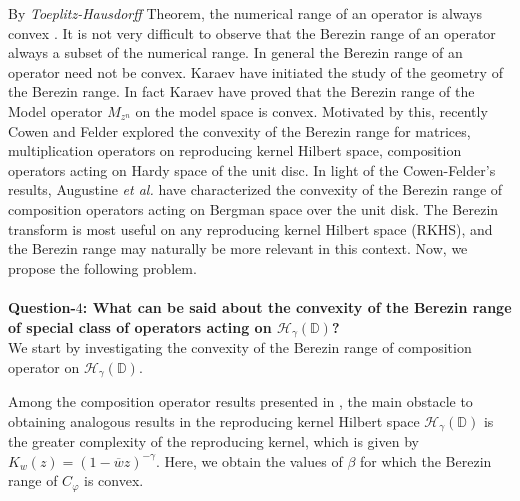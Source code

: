 \documentclass[12pt, reqno]{amsart}
\theoremstyle{definition}
\theoremstyle{remark}
\numberwithin{equation}{section}
\begin{document}
By \textit{Toeplitz-Hausdorff} Theorem, the numerical range of an operator is always convex \cite{Gustafson_PAMS_1970}. It is not very difficult to observe that the Berezin range of an operator always a subset of the numerical range. In general the Berezin range of an operator need not be convex. Karaev \cite{Karaev} have initiated the study of the geometry of the Berezin range. In fact Karaev \cite{Karaev} have proved that the Berezin range of the Model operator $M_{z^n}$ on the model space is convex.  Motivated by this, recently Cowen and Felder \cite{CowenFelder} explored the convexity of the Berezin range for matrices, multiplication operators on reproducing kernel Hilbert space, composition operators acting on Hardy space of the unit disc. In light of the Cowen-Felder's results, Augustine {\it et al.} \cite{Augustine_Garayev_Shankar_CAOT_2023} have characterized the convexity of the Berezin range of composition operators acting on Bergman space over the unit disk.  
The Berezin transform is most useful on any reproducing kernel Hilbert space (RKHS), and the Berezin range may naturally be more relevant in this context. Now, we propose the following problem.
\\ \\
{\bf Question-$4$:  What can be said about the convexity of the Berezin range of special class of operators acting on $\mathcal{H}_\gamma(\mathbb{D})$?}
\\
We start by investigating the convexity of the Berezin range of composition operator on $\mathcal{H}_\gamma(\mathbb{D})$.


Among the composition operator results presented in \cite{Augustine_Garayev_Shankar_CAOT_2023, CowenFelder}, the main obstacle to obtaining analogous results in the reproducing kernel Hilbert space $\mathcal{H}_\gamma(\mathbb{D})$ is the greater complexity of the reproducing kernel, which is given by $ K_w(z)=(1-\overline{w}z)^{-\gamma}.$
Here, we obtain the values of $\beta$ for which the Berezin range of $C_\varphi$ is convex.
\end{document}
